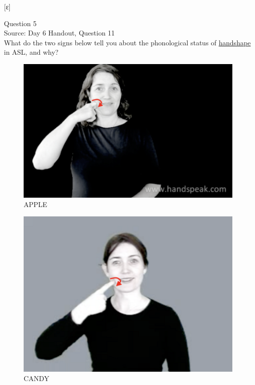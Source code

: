 \documentclass[12pt]{article}
\begin{document}
{[ɛ]}


\newpage

{\large Question 5}\\

Source: Day 6 Handout, Question 11\\

What do the two signs below tell you about the phonological status of \underline{handshape} in ASL, and why?\\

\begin{figure}[H]
\includegraphics{../images/asl_apple.png}
\caption{APPLE}
\end{figure}
\begin{figure}[H]
\includegraphics{../images/asl_candy.png}
\caption{CANDY}
\end{figure}
\end{document}

